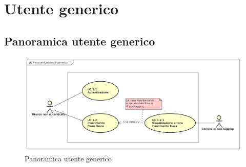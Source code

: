 \section{Utente generico}
\subsection{Panoramica utente generico}
\begin{figure}[H]
\centering
\includegraphics[width=17cm]{img/PanoramicaUtenteGenerico.png} 
\caption{Panoramica utente generico}\label{fig:1}
\end{figure}


